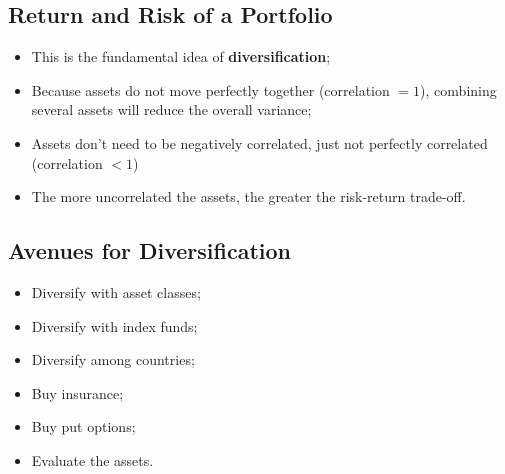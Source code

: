 \documentclass[11pt,a4paper]{report}
\begin{document}
\subsection{Return and Risk of a Portfolio}
\begin{itemize}
    \item This is the fundamental idea of \textbf{diversification};
    \item Because assets do not move perfectly together (correlation $= 1$), combining several assets will reduce the overall variance;
    \item Assets don't need to be negatively correlated, just not perfectly correlated (correlation $< 1$)
    \item The more uncorrelated the assets, the greater the risk-return trade-off.
\end{itemize}
\subsection{Avenues for Diversification}
\begin{itemize}
    \item Diversify with asset classes;
    \item Diversify with index funds;
    \item Diversify among countries;
    \item Buy insurance;
    \item Buy put options;
    \item Evaluate the assets.
\end{itemize}
\end{document}
